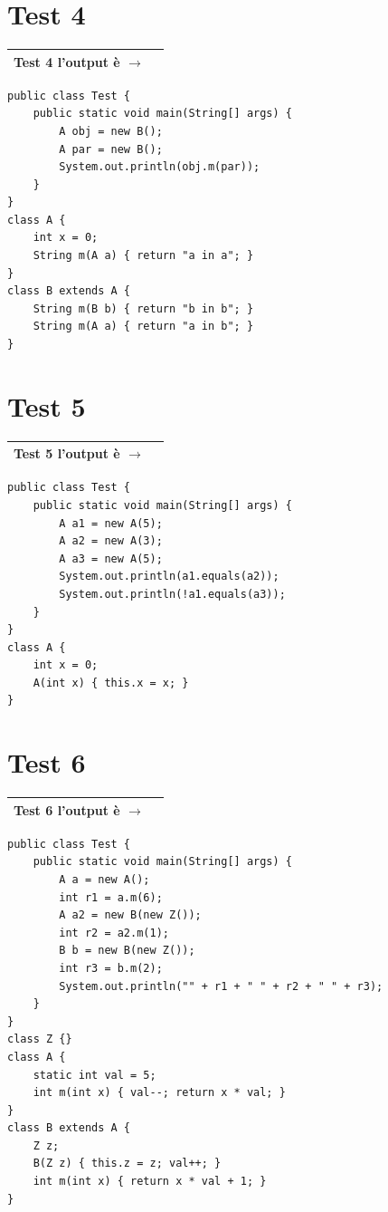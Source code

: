 \documentclass[a4paper,12pt]{article}
\newcommand{\outputbox}[1]{%
  \vspace{0.4em}
  \noindent
  \begin{tabular}{|l|p{10cm}|}
    \hline
    \rule{0pt}{1.8em}\textbf{#1} \quad l'output è $\rightarrow$ & \phantom{XXXXXXXXXXXXXXXXXXX} \\
    \hline
  \end{tabular}
  \vspace{0.4em}
}
\begin{document}
\section*{Test 4}
\outputbox{Test 4}

\begin{lstlisting}[style=java]
public class Test {
    public static void main(String[] args) {
        A obj = new B();
        A par = new B();
        System.out.println(obj.m(par));
    }
}
class A {
    int x = 0;
    String m(A a) { return "a in a"; }
}
class B extends A {
    String m(B b) { return "b in b"; }
    String m(A a) { return "a in b"; }
}
\end{lstlisting}

\section*{Test 5}
\outputbox{Test 5}

\begin{lstlisting}[style=java]
public class Test {
    public static void main(String[] args) {
        A a1 = new A(5);
        A a2 = new A(3);
        A a3 = new A(5);
        System.out.println(a1.equals(a2));
        System.out.println(!a1.equals(a3));
    }
}
class A {
    int x = 0;
    A(int x) { this.x = x; }
}
\end{lstlisting}

\section*{Test 6}
\outputbox{Test 6}

\begin{lstlisting}[style=java]
public class Test {
    public static void main(String[] args) {
        A a = new A();
        int r1 = a.m(6);
        A a2 = new B(new Z());
        int r2 = a2.m(1);
        B b = new B(new Z());
        int r3 = b.m(2);
        System.out.println("" + r1 + " " + r2 + " " + r3);
    }
}
class Z {}
class A {
    static int val = 5;
    int m(int x) { val--; return x * val; }
}
class B extends A {
    Z z;
    B(Z z) { this.z = z; val++; }
    int m(int x) { return x * val + 1; }
}
\end{lstlisting}
\end{document}
